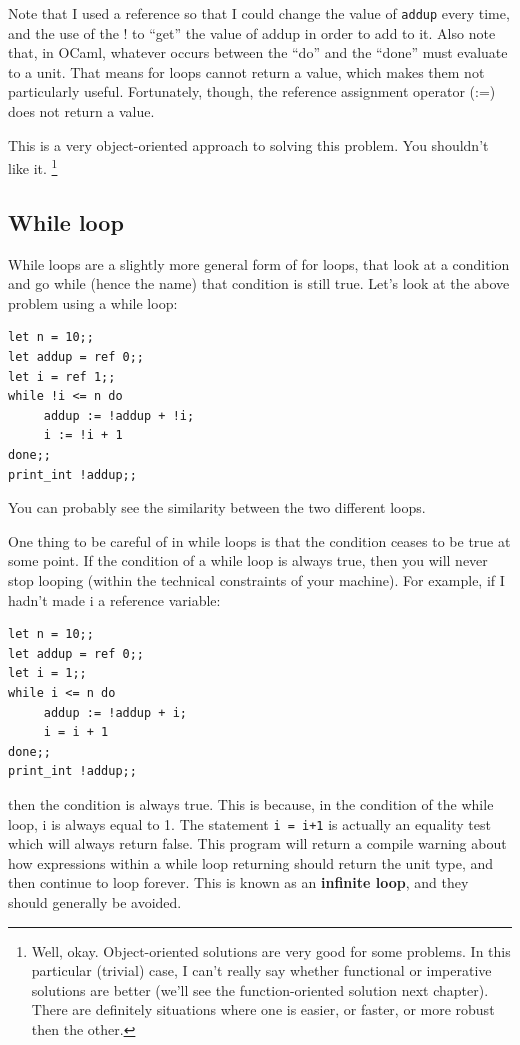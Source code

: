 \documentclass[10pt]{book}
\begin{document}
Note that I used a reference so that I could change the value of {\tt addup} every time, 
and the use of the ! to ``get'' the value of addup in order to add to it. Also note that, 
in OCaml, whatever occurs between the ``do'' and the ``done'' must evaluate to a unit. 
That means for loops cannot return a value, which makes them not particularly useful. 
Fortunately, though, the reference assignment operator (:=) does not return a value.

This is a very object-oriented approach to solving this problem. You shouldn't like it.
\footnote{Well, okay. Object-oriented solutions are very good for some problems. In this 
particular (trivial) case, I can't really say whether functional or imperative solutions 
are better (we'll see the function-oriented solution next chapter). There are definitely 
situations where one is easier, or faster, or more robust then the other.}

\subsection{While loop}

While loops are a slightly more general form of for loops, that look at a condition and
go while (hence the name) that condition is still true. Let's look at the above problem
using a while loop:

\beforeverb
\begin{verbatim}
let n = 10;;
let addup = ref 0;;
let i = ref 1;;
while !i <= n do
     addup := !addup + !i;
     i := !i + 1
done;;
print_int !addup;;
\end{verbatim}
\afterverb

You can probably see the similarity between the two different loops.

One thing to be careful of in while loops is that the condition ceases to be true at 
some point. If the condition of a while loop is always true, then you will never stop 
looping (within the technical constraints of your machine). For example, if I hadn't
made i a reference variable:
\beforeverb
\begin{verbatim}
let n = 10;;
let addup = ref 0;;
let i = 1;;
while i <= n do
     addup := !addup + i;
     i = i + 1
done;;
print_int !addup;;
\end{verbatim}
\afterverb
then the condition is always true. This is because, in the condition of the while loop,
i is always equal to 1. The statement {\tt i = i+1} is actually an equality test which will always
return false. This program will return a compile warning about how expressions within a while loop 
returning should return the unit type, and then continue to loop forever. This is known as
an {\bf infinite loop}, and they should generally be avoided.
\end{document}
